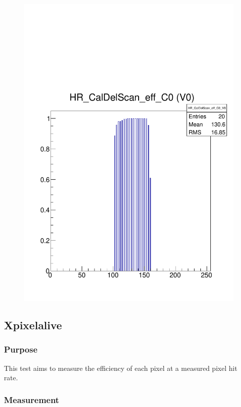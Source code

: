 \documentclass[a4paper,12pt,twoside]{article}
\begin{document}
\begin{figure} [h!]
\begin{minipage}{.48\textwidth}
  \includegraphics[width=\textwidth]{./CalDel_Efficiency.pdf}
  \label{CalDel-Efficiency}
\end{minipage}
\end{figure}

\subsection{Xpixelalive}

\subsubsection{Purpose}

This test aims to measure the efficiency of each pixel at a measured pixel hit rate.

\subsubsection{Measurement}
\end{document}
